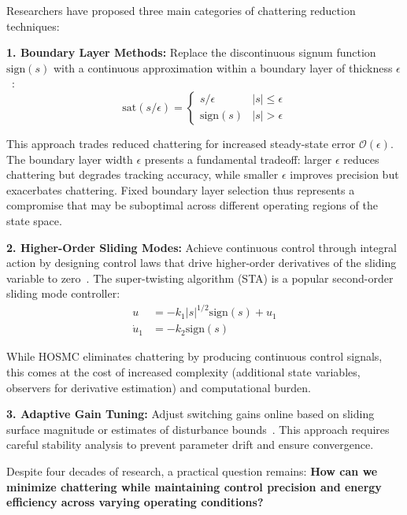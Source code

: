 \documentclass[12pt,a4paper,oneside]{report}
\begin{document}
Researchers have proposed three main categories of chattering reduction techniques:

\textbf{1. Boundary Layer Methods:} Replace the discontinuous signum function $\text{sign}(s)$ with a continuous approximation within a boundary layer of thickness $\epsilon$~\cite{slotine1991applied}:
\begin{equation}
\text{sat}(s/\epsilon) = \begin{cases}
s/\epsilon & |s| \leq \epsilon \\
\text{sign}(s) & |s| > \epsilon
\end{cases}
\end{equation}

This approach trades reduced chattering for increased steady-state error $\mathcal{O}(\epsilon)$. The boundary layer width $\epsilon$ presents a fundamental tradeoff: larger $\epsilon$ reduces chattering but degrades tracking accuracy, while smaller $\epsilon$ improves precision but exacerbates chattering. Fixed boundary layer selection thus represents a compromise that may be suboptimal across different operating regions of the state space.

\textbf{2. Higher-Order Sliding Modes:} Achieve continuous control through integral action by designing control laws that drive higher-order derivatives of the sliding variable to zero~\cite{levant2007principles}. The super-twisting algorithm (STA) is a popular second-order sliding mode controller:
\begin{equation}
\begin{aligned}
u &= -k_1 |s|^{1/2} \text{sign}(s) + u_1 \\
\dot{u}_1 &= -k_2 \text{sign}(s)
\end{aligned}
\end{equation}

While HOSMC eliminates chattering by producing continuous control signals, this comes at the cost of increased complexity (additional state variables, observers for derivative estimation) and computational burden.

\textbf{3. Adaptive Gain Tuning:} Adjust switching gains online based on sliding surface magnitude or estimates of disturbance bounds~\cite{bartolini1998chattering}. This approach requires careful stability analysis to prevent parameter drift and ensure convergence.

Despite four decades of research, a practical question remains: \textbf{How can we minimize chattering while maintaining control precision and energy efficiency across varying operating conditions?}
\end{document}
